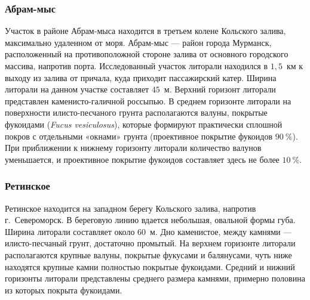             \subsubsection{Абрам-мыс}
Участок  в районе  Абрам-мыса  находится в третьем колене Кольского залива, максимально удаленном от моря.
Абрам-мыс --- район   города   Мурманск,  расположенный   на противоположной стороне залива от основного городского массива, напротив порта. 
Исследованный участок   литорали   находился   в   $1,5$~км   к   выходу   из   залива   от   причала,   куда   приходит пассажирский катер. 
Ширина   литорали   на   данном   участке   составляет   $45$~м.   
Верхний   горизонт   литорали представлен  каменисто-галичной  россыпью. 
В среднем  горизонте литорали на поверхности илисто-песчаного   грунта   располагаются   валуны,   покрытые   фукоидами   ({\it Fucus  vesiculosus}), которые   формируют   практически   сплошной   покров   с   отдельными   «окнами»   грунта (проективное  покрытие фукоидов $90~\%$).  
При приближении  к нижнему горизонту литорали количество   валунов   уменьшается,   и   проективное   покрытие   фукоидов   составляет   здесь   не более $10~\%$.

\subsubsection{Ретинское}
Ретинское находится на западном берегу Кольского залива, напротив г.~Североморск. 
В береговую линию вдается небольшая, овальной формы губа. 
Ширина литорали составляет около $60$~м. 
Дно каменистое, между камнями --- илисто-песчаный грунт, достаточно промытый. 
На верхнем горизонте литорали располагаются крупные валуны, покрытые фукусами и балянусами, чуть ниже находятся крупные камни полностью покрытые фукоидами.
Средний и нижний горизонты литорали представлены среднего размера камнями, примерно половина из которых покрыта фукоидами. 

